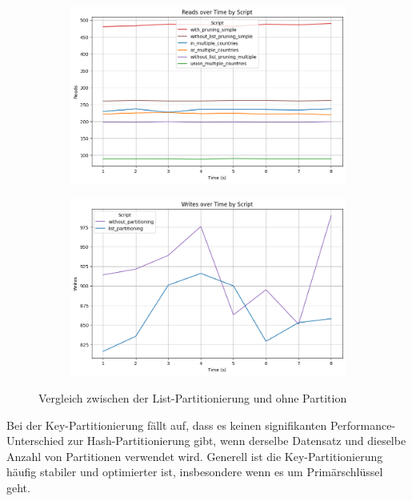 \vspace{-8pt}
\begin{figure}[H]
	\centering
	\begin{subfigure}[t]{0.48\textwidth}
		\includegraphics[width=\textwidth]{PNGs/Script/Partition/list-partition/Reads}
	\end{subfigure}
	\hfill
	\begin{subfigure}[t]{0.48\textwidth}
		\includegraphics[width=\textwidth]{PNGs/Script/Partition/list-partition/Writes}
	\end{subfigure}
	\vspace{-20pt}
	\caption[List-Partitionierung: Unterschiedliche Abfragen mit und ohne Partition]{Vergleich zwischen der List-Partitionierung und ohne Partition}
	\label{fig:list-partition}
\end{figure}
\vspace{-20pt}

Bei der Key-Partitionierung fällt auf, dass es keinen signifikanten Performance-Unterschied zur Hash-Partitionierung gibt, wenn derselbe Datensatz und dieselbe Anzahl von Partitionen verwendet wird.
Generell ist die Key-Partitionierung häufig stabiler und optimierter ist, insbesondere wenn es um Primärschlüssel geht.

